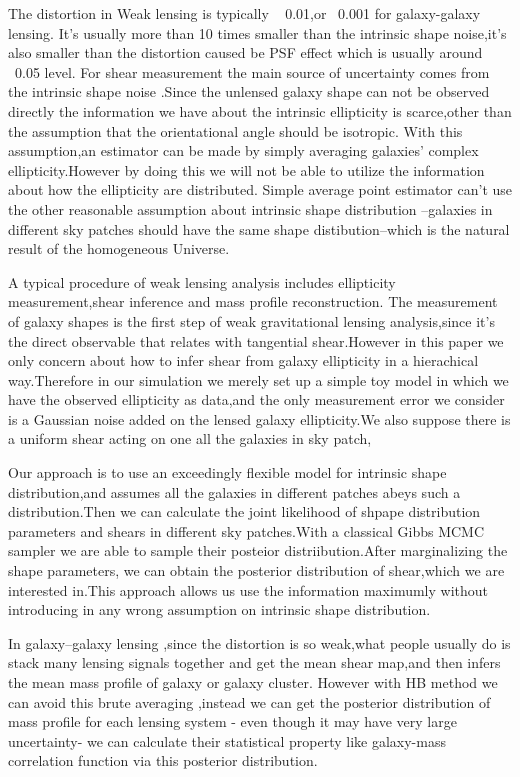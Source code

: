 \documentclass[useAMS,usenatbib]{mn2e}
\begin{document}
The distortion in Weak lensing is typically ~ 0.01,or ~0.001 for
galaxy-galaxy lensing. It's usually more than 10 times smaller than
the intrinsic shape noise,it's also smaller than the distortion caused
be PSF effect which is usually around ~0.05 level. For shear measurement
the main source of uncertainty comes from the intrinsic shape noise
.Since the unlensed galaxy shape can not be observed directly the information
we have about the intrinsic ellipticity is scarce,other than  the assumption that 
the orientational angle should be isotropic. With
this assumption,an estimator can be made by simply averaging galaxies' complex
ellipticity.However by doing this we will not be able to utilize the
information about how the ellipticity are distributed. Simple average
point estimator can't use the other reasonable assumption about intrinsic
shape distribution --galaxies in different sky patches should have
the same shape distibution--which is the natural result of the homogeneous Universe.

A typical procedure of weak lensing analysis  includes ellipticity
measurement,shear inference and mass profile reconstruction. The measurement
of galaxy shapes is the first step of weak gravitational lensing analysis,since
it's the direct observable that relates with tangential shear.However
in this paper we only concern about how to infer shear from galaxy
ellipticity in a hierachical way.Therefore in our simulation we merely
set up a simple toy model in which we have the observed ellipticity as
data,and the only measurement error we consider is a Gaussian noise
added on the lensed galaxy ellipticity.We also suppose there is a uniform shear
acting on one all the galaxies in sky patch,

Our approach is to use an exceedingly flexible model for intrinsic
shape distribution,and assumes all the galaxies in different patches
abeys such a distribution.Then we can calculate the joint likelihood
of shpape distribution parameters and shears in different sky patches.With
a classical Gibbs MCMC sampler we are able to sample their posteior
distriibution.After marginalizing the shape parameters, we can obtain
the posterior distribution of shear,which we are interested in.This
approach allows us use the information maximumly without introducing
in any wrong assumption on intrinsic shape distribution.

In galaxy--galaxy lensing ,since the distortion is so weak,what people
usually do is stack many lensing signals together and get the mean
shear map,and then infers the mean mass profile of galaxy or galaxy
cluster. However with HB method we can avoid this brute averaging
,instead we can get the posterior distribution of mass profile for
each lensing system - even though it may have very large uncertainty- we
can calculate their statistical property like galaxy-mass correlation
function via this posterior distribution.
\end{document}
